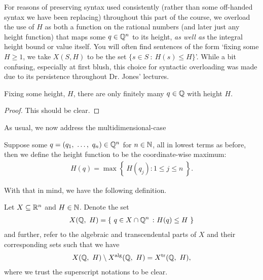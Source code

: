 \begin{svgraybox}
  For reasons of preserving syntax used consistently (rather than some off-handed syntax we have been replacing) throughout this part of the course, we overload the use of $H$ as both a function on the rational numbers (and later just any height function) that maps some $q \in \Q^n$ to its height, \emph{as well as} the integral height bound or value itself. You will often find sentences of the form `fixing some $H \geq 1$, we take $X(S, H)$ to be the set $\{ s \in S \ \colon \ H(s) \leq H \}$'. While a bit confusing, especially at first blush, this choice for syntactic overloading was made due to its persistence throughout Dr. Jones' lectures.
\end{svgraybox}


\begin{corollary}
  Fixing some height, $H$, there are only finitely many $q \in \Q$ with height $H$.
\end{corollary}
\begin{proof}
  This should be clear.
\end{proof}

As usual, we now address the multidimensional-case
\begin{definition}
  Suppose some $q = (\vonevm{q}{n}) \in \Q^n$ for $n \in \N$, all in lowest terms as before, then we define the height function to be the coordinate-wise maximum:
    \begin{align*}
      H(q) = \max{ \left\{ \ H(q_j) \colon 1 \leq j \leq n \ \right\} }.
    \end{align*}
  \label{defn:Qn_height}
\end{definition}

With that in mind, we have the following definition.
\begin{definition}
  Let $\XRn[X]{n}$ and $H \in \N$. Denote the set
    \begin{align*}
      \XQH[H] = \left\{ \ q \in X \cap \Q^n \ \colon H(q) \leq H \ \right\}
    \end{align*}
    and further, refer to the algebraic and transcendental parts of $X$ and their corresponding sets such that we have
    \begin{align*}
      \XQH[H] \setminus \XalgQH[H] = \XtrQH[H],
    \end{align*}
    where we trust the superscript notations to be clear.
  \label{defn:height_sets}
\end{definition}

